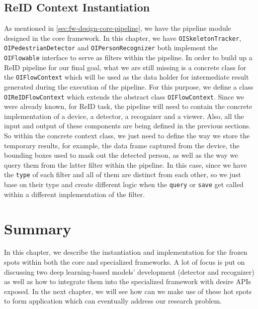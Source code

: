 \subsection{ReID Context Instantiation}
\label{sec:fw-inst-context}

As mentioned in \autoref{sec:fw-design-core-pipeline}, we have the pipeline
module designed in the core framework. In this chapter, we have
\texttt{OISkeletonTracker}, \texttt{OIPedestrianDetector} and
\texttt{OIPersonRecognizer} both implement the \texttt{OIFlowable} interface to
serve as filters within the pipeline. In order to build up a ReID pipeline for
our final goal, what we are still missing is a concrete class for the
\texttt{OIFlowContext} which will be used as the data holder for intermediate
result generated during the execution of the pipeline.
For this purpose, we define a class \texttt{OIReIDFlowContext} which extends
the abstract class \texttt{OIFlowContext}.
Since we were already known, for ReID task, the pipeline will need to contain
the concrete implementation of a device, a detector, a recognizer and a viewer.
Also, all the input and output of these components are
being defined in the previous sections. So within the concrete context class,
we just need to define the way we store the temporary results, for example, the
data frame captured from the device, the bounding boxes used to mask out the
detected person, as well as the way we query them from the latter filter within
the pipeline.
In this case, since we have the \texttt{type} of each filter and all of them
are distinct from each other, so we just base on their type and create
different logic when the \texttt{query} or \texttt{save} get called within
a different implementation of the filter.

\section{Summary}
\label{sec:fw-inst-summary}

In this chapter, we describe the instantiation and implementation for the
frozen spots within both the core and specialized frameworks. A lot of focus is
put on discussing two deep learning-based models' development (detector and
recognizer) as well as how to integrate them into the specialized framework
with desire APIs exposed.
In the next chapter, we will see how can we make use of these hot spots to form
application which can eventually address our research problem.

